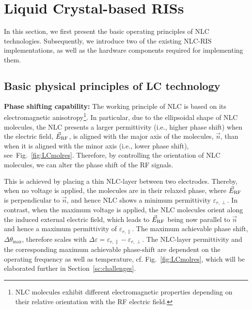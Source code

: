 \section{Liquid Crystal-based RISs}

In this section, we first present the basic operating principles of \gls{NLC} technologies. Subsequently, we introduce two of the existing \gls{NLC}-\gls{RIS} implementations, as well as the hardware components required for implementing them.

\subsection{Basic physical principles of LC technology}\label{Sec:Basic}

\textbf{Phase shifting capability:}  
The working principle of \gls{NLC} is based on its electromagnetic anisotropy\footnote{\gls{NLC} molecules exhibit different electromagnetic properties depending on their relative orientation with the \gls{RF} electric field.}. In particular, due to the ellipsoidal shape of \gls{NLC} molecules, the \gls{NLC} presents a larger permittivity (i.e., higher phase shift) when the electric field, $\vec{E}_{\rm RF}$, is aligned with the major axis of the molecules, $\vec{n}$, than when it is aligned with  the minor axis (i.e., lower phase shift), see~Fig.~\ref{fig:LCmolres}. Therefore, by controlling the orientation of \gls{NLC} molecules, we can alter the phase shift of the \gls{RF} signals. 

    



This is achieved by placing a thin \gls{NLC}-layer between two electrodes. Thereby, when no voltage is applied, the molecules are in their relaxed phase, where $\vec{E}_{\rm RF}$ is perpendicular to $\vec{n}$, and hence \gls{NLC} shows a minimum permittivity $\varepsilon_{r,\perp}$. In contrast, when the maximum voltage is applied, the \gls{NLC} molecules orient along the induced external electric field, which leads to $\vec{E}_{\rm RF}$ being now parallel to $\vec{n}$ and hence a maximum permittivity of $\varepsilon_{r,\parallel}$. The maximum achievable phase shift, $\Delta\theta_{\max}$, therefore scales with $\Delta\varepsilon = {\varepsilon_{r, \parallel}} - {\varepsilon_{r, \perp}}$.  The \gls{NLC}-layer permittivity and the corresponding maximum achievable phase-shift are dependent on the operating frequency as well as temperature, cf. Fig.~\ref{fig:LCmolres}, which will be elaborated further in Section~\ref{sc:challenges}. 

